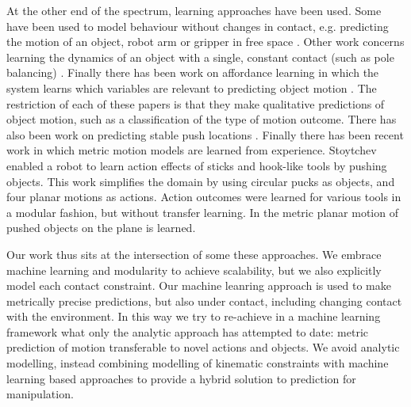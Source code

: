 At the other end of the spectrum, learning approaches have been used. Some have been used to model behaviour without changes in contact, e.g. predicting the motion of an object, robot arm or gripper in free space \citep{Ting06,Boots14,dearden2005learning}. Other work concerns learning the dynamics of an object with a single, constant contact (such as pole balancing) \citep{Schaal97,SchaalAtkeson97}. Finally there has been work on affordance learning in which the system learns which variables are relevant to predicting object motion \citep{montesano08,moldovan12,hermans11,fitzpatrick_learning_2003,ridge2010self,kroemer2014}. The restriction of each of these papers is that they make qualitative predictions of object motion, such as a classification of the type of motion outcome. There has also been work on predicting stable push locations \citep{hermans13}. Finally there has been recent work in which metric motion models are learned from experience. Stoytchev \citep{Stoytchev_affordances_2008} enabled a robot to learn action effects of sticks and hook-like tools by pushing objects. This work simplifies the domain by using circular pucks as objects, and four planar motions as actions. Action outcomes were learned for various tools in a modular fashion, but without transfer learning.  In \citep{mericli2014} the metric planar motion of pushed objects on the plane is learned. 

Our work thus sits at the intersection of some these approaches. We embrace machine learning and modularity to achieve scalability, but we also explicitly model each contact constraint. Our machine leanring approach is used to make metrically precise predictions, but also under contact, including changing contact with the environment. In this way we try to re-achieve in a machine learning framework what only the analytic approach has attempted to date: metric prediction of motion transferable to novel actions and objects. We avoid analytic modelling, instead combining modelling of kinematic constraints with machine learning based approaches to provide a hybrid solution to prediction for manipulation.